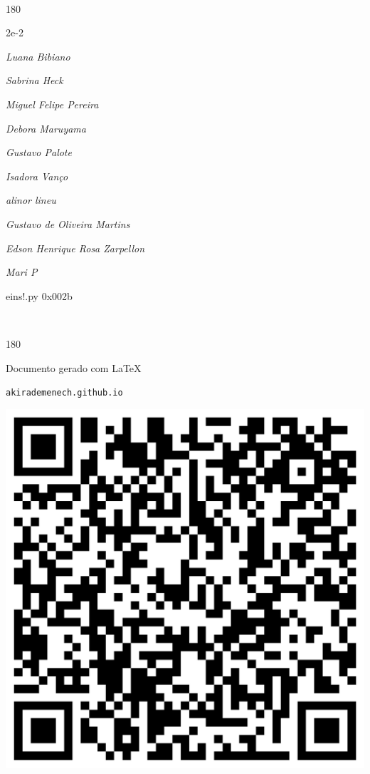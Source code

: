 \documentclass[12pt]{article}
\begin{document}
\pagebreak			

	\ 
	\vfill
	\begin{turn}{180}	
		\begin{minipage}{\textwidth}
		  	\ttfamily %
			\centering
			{\Huge 2e-2}
		  
			\hfill
		  
			

\textit{\small Luana Bibiano}

\textit{\small Sabrina Heck}

\textit{\small Miguel Felipe Pereira}

\textit{\small Debora Maruyama}

\textit{\small Gustavo Palote}

\textit{\small Isadora Vanço}

\textit{\small alinor lineu}

\textit{\small Gustavo de Oliveira Martins}

\textit{\small Edson Henrique Rosa Zarpellon}

\textit{\small Mari P}

\bigskip

eins!.py
0x002b


		\end{minipage}	
	\end{turn}
	\vfill
	\

\pagebreak

	\begin{turn}{180}	
		\begin{minipage}{\textwidth}		  
		  Documento gerado com \LaTeX			
		  
		  \texttt{akirademenech.github.io}

		  \includegraphics[height=0.3\textheight]{2e-2.pdf}

		\end{minipage}	
	\end{turn}  
		  
\end{document}
